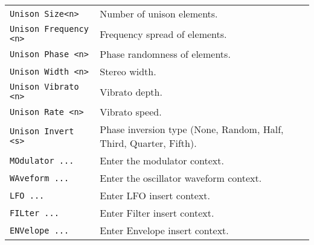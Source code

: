 \begin{table}[H]
\begin{tabular}{l l}
\texttt{Unison Size<n>} &
   Number of unison elements. \\
\texttt{Unison Frequency <n>} &
   Frequency spread of elements. \\
\texttt{Unison Phase <n>} &
   Phase randomness of elements. \\
\texttt{Unison Width <n>} &
   Stereo width. \\
\texttt{Unison Vibrato <n>} &
   Vibrato depth. \\
\texttt{Unison Rate <n>} &
   Vibrato speed. \\
\texttt{Unison Invert <s>} &
   Phase inversion type (None, Random, Half, Third, Quarter, Fifth). \\
\texttt{MOdulator ...} &
   Enter the modulator context. \\
\texttt{WAveform ...} &
   Enter the oscillator waveform context. \\
\texttt{LFO ...} &
   Enter LFO insert context.  \\
\texttt{FILter ...} &
   Enter Filter insert context.  \\
\texttt{ENVelope ...} &
   Enter Envelope insert context.   \\
      \end{tabular}
   \end{table}

